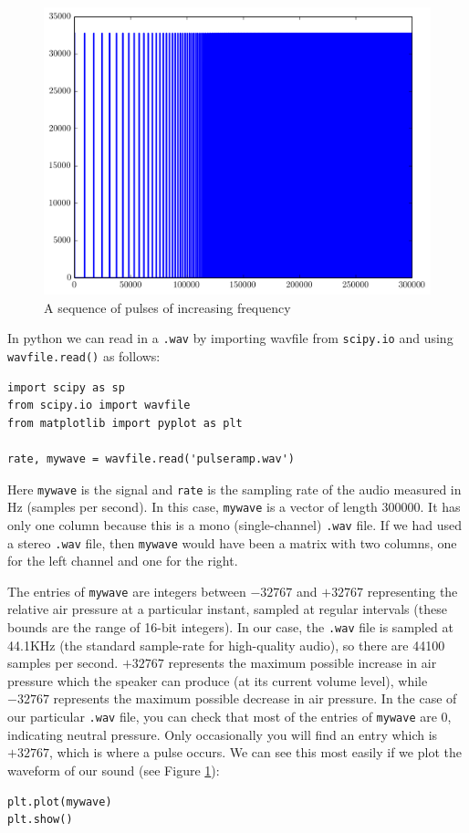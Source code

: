 \begin{figure}[ht]\caption{A sequence of pulses of increasing frequency}\label{pulseramp}\centering\includegraphics[width=\textwidth]{pulseramp}\end{figure}

In python we can read in a \texttt{.wav} by importing wavfile from \texttt{scipy.io} and using \texttt{wavfile.read()} as follows:
\begin{lstlisting}
import scipy as sp
from scipy.io import wavfile
from matplotlib import pyplot as plt

rate, mywave = wavfile.read('pulseramp.wav')
\end{lstlisting}

Here \texttt{mywave} is the signal and \texttt{rate} is the sampling rate of the audio measured in Hz (samples per second).
In this case, \texttt{mywave} is a vector of length $300000$.
It has only one column because this is a mono (single-channel) \texttt{.wav} file.
If we had used a stereo \texttt{.wav} file, then \texttt{mywave} would have been a matrix with two columns, one for the left channel and one for the right.

The entries of \texttt{mywave} are integers between $-32767$ and $+32767$ representing the relative air pressure at a particular instant, sampled at regular intervals (these bounds are the range of 16-bit integers).
In our case, the \texttt{.wav} file is sampled at 44.1KHz (the standard sample-rate for high-quality audio), so there are 44100 samples per second. 
$+32767$ represents the maximum possible increase in air pressure which the speaker can produce (at its current volume level), while $-32767$ represents the maximum possible decrease in air pressure.
In the case of our particular \texttt{.wav} file, you can check that most of the entries of \texttt{mywave} are $0$, indicating neutral pressure. 
Only occasionally you will find an entry which is $+32767$, which is where a pulse occurs.
We can see this most easily if we plot the waveform of our sound (see Figure \ref{pulseramp}):
\begin{lstlisting}
plt.plot(mywave)
plt.show()
\end{lstlisting}

